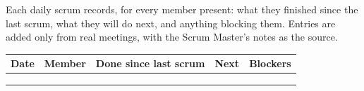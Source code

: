 \documentclass[10pt,a4paper]{article}
\newcommand{\entry}[5]{#1 & #2 & #3 & #4 & #5\\\midrule}
\begin{document}
\makedoctitle

Each daily scrum records, for every member present: what they finished since the last scrum, what they will do next, and anything blocking them. Entries are added only from real meetings, with the Scrum Master's notes as the source.

{\small
\begin{longtable}{@{}p{20mm} p{32mm} >{\raggedright\arraybackslash}p{60mm} >{\raggedright\arraybackslash}p{60mm} >{\raggedright\arraybackslash}p{55mm}@{}}
\toprule
\textbf{Date} & \textbf{Member} & \textbf{Done since last scrum} & \textbf{Next} & \textbf{Blockers}\\
\midrule
\endhead
\bottomrule
\endfoot
 & & & & \\[14pt]\midrule
 & & & & \\[14pt]\midrule
 & & & & \\[14pt]
\end{longtable}
}
\end{document}
